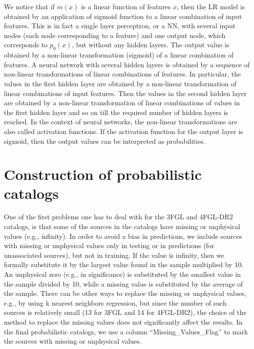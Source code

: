 We notice that if $m(x)$ is a linear function of features $x$, then the LR model is obtained by an application of sigmoid function to a linear combination of input features.
This is in fact a single layer perceptron, or a NN, with several input nodes (each node corresponding to a feature) and one output node, which corresponds to $p_0(x)$, but without any hidden layers.
The output value is obtained by a non-linear transformation (sigmoid) of a linear combination of features.
A neural network with several hidden layers is obtained by a sequence of non-linear transformations of linear combinations of features.
In particular, the values in the first hidden layer are obtained by a non-linear transformation of linear combinations of input features.
Then the values in the second hidden layer are obtained by a non-linear transformation of linear combinations of values in the first hidden layer and so on till the required number of hidden layers is reached.
In the context of neural networks, the non-linear transformations are also called activation functions.
If the activation function for the output layer is sigmoid, then the output values can be interpreted as probabilities.


\section{Construction of probabilistic catalogs}

One of the first problems one has to deal with for the 3FGL and 4FGL-DR2 catalogs, is that
some of the sources in the catalogs have missing or unphysical values (e.g., infinity).
In order to avoid a bias in predictions, we include sources with missing or unphysical values only in testing or in predictions (for unassociated sources), but not in training.
If the value is infinity, then we formally substitute it by the largest value found in the sample multiplied by 10.
An unphysical zero (e.g., in significance) is substituted by the smallest value in the sample divided by 10,
while a missing value is substituted by the average of the sample.
There can be other ways to replace the missing or unphysical values, e.g., by using k nearest neighbors regression, 
but since the number of such sources is relatively small (13 for 3FGL and 14 for 4FGL-DR2), 
the choice of the method to replace the missing values does not significantly affect the results.
In the final probabilistic catalogs, we use a column ``Missing\_Values\_Flag'' to mark 
the sources with missing or unphysical values.

